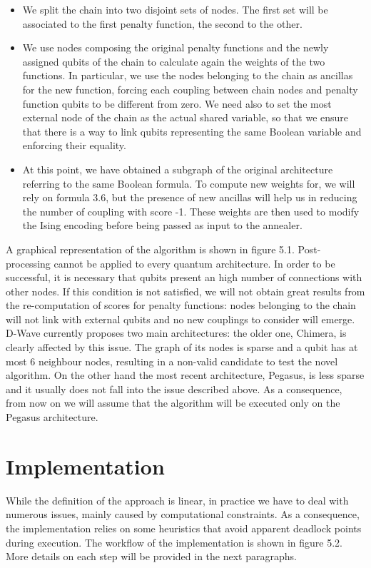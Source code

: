 \begin{itemize}
    \item We split the chain into two disjoint sets of nodes. The first set will be associated to the first penalty function, the second to the other.
    \item We use nodes composing the original penalty functions and the newly assigned qubits of the chain to calculate again the weights of the two functions. In particular, we use the nodes belonging to the chain as ancillas for the new function, forcing each coupling between chain nodes and penalty function qubits to be different from zero. We need also to set the most external node of the chain as the actual shared variable, so that we ensure that there is a way to link qubits representing the same Boolean variable and enforcing their equality.
    \item At this point, we have obtained a subgraph of the original architecture referring to the same Boolean formula. To compute new weights for, we will rely on formula 3.6, but the presence of new ancillas will help us in reducing the number of coupling with score -1. These weights are then used to modify the Ising encoding before being passed as input to the annealer.
\end{itemize}

A graphical representation of the algorithm is shown in figure 5.1.
Post-processing cannot be applied to every quantum architecture. In order to be successful, it is necessary that qubits present an high number of connections with other nodes. If this condition is not satisfied, we will not obtain great results from the re-computation of scores for penalty functions: nodes belonging to the chain will not link with external qubits and no new couplings to consider will emerge. D-Wave currently proposes two main architectures: the older one, Chimera, is clearly affected by this issue. The graph of its nodes is sparse and a qubit has at most 6 neighbour nodes, resulting in a non-valid candidate to test the novel algorithm. On the other hand the most recent architecture, Pegasus, is less sparse and it usually does not fall into the issue described above. As a consequence, from now on we will assume that the algorithm will be executed only on the Pegasus architecture.


\section{Implementation}

While the definition of the approach is linear, in practice we have to deal with numerous issues, mainly caused by computational constraints. As a consequence, the implementation relies on some heuristics that avoid apparent deadlock points during execution.
The workflow of the implementation is shown in figure 5.2.
More details on each step will be provided in the next paragraphs.

